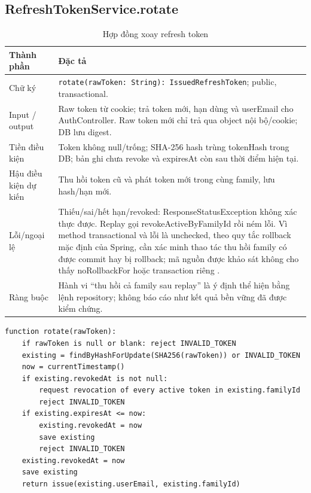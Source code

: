 \documentclass[12pt,a4paper,oneside]{report}
\begin{document}
\subsection{RefreshTokenService.rotate}
\begin{table}[htbp]
\centering\small
\caption{Hợp đồng xoay refresh token}
\begin{tabularx}{\textwidth}{@{}p{3.1cm}Y@{}}\toprule
Thành phần & Đặc tả\\\midrule
Chữ ký & \texttt{rotate(rawToken: String): IssuedRefreshToken}; public, transactional.\\
Input / output & Raw token từ cookie; trả token mới, hạn dùng và userEmail cho AuthController. Raw token mới chỉ trả qua object nội bộ/cookie; DB lưu digest.\\
Tiền điều kiện & Token không null/trống; SHA-256 hash trùng tokenHash trong DB; bản ghi chưa revoke và expiresAt còn sau thời điểm hiện tại.\\
Hậu điều kiện dự kiến & Thu hồi token cũ và phát token mới trong cùng family, lưu hash/hạn mới.\\
Lỗi/ngoại lệ & Thiếu/sai/hết hạn/revoked: ResponseStatusException không xác thực được. Replay gọi revokeActiveByFamilyId rồi ném lỗi. Vì method transactional và lỗi là unchecked, theo quy tắc rollback mặc định của Spring, cần xác minh thao tác thu hồi family có được commit hay bị rollback; mã nguồn được khảo sát không cho thấy noRollbackFor hoặc transaction riêng \cite{springtx}.\\
Ràng buộc & Hành vi “thu hồi cả family sau replay” là ý định thể hiện bằng lệnh repository; không báo cáo như kết quả bền vững đã được kiểm chứng.\\
\bottomrule\end{tabularx}
\end{table}

\begin{lstlisting}[style=pseudo]
function rotate(rawToken):
    if rawToken is null or blank: reject INVALID_TOKEN
    existing = findByHashForUpdate(SHA256(rawToken)) or INVALID_TOKEN
    now = currentTimestamp()
    if existing.revokedAt is not null:
        request revocation of every active token in existing.familyId
        reject INVALID_TOKEN
    if existing.expiresAt <= now:
        existing.revokedAt = now
        save existing
        reject INVALID_TOKEN
    existing.revokedAt = now
    save existing
    return issue(existing.userEmail, existing.familyId)
\end{lstlisting}
\end{document}

